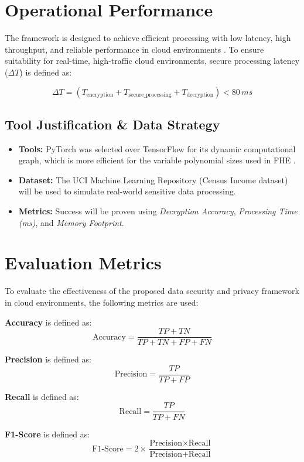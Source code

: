 \documentclass[12pt, a4paper]{article}
\begin{document}
\section{Operational Performance}
The framework is designed to achieve efficient processing with low latency, high throughput, and reliable performance in cloud environments \cite{alam2024fastapi}.
To ensure suitability for real-time, high-traffic cloud environments, secure processing latency ($\Delta T$) is defined as:

\[
\Delta T = (T_{\text{encryption}} + T_{\text{secure\_processing}} + T_{\text{decryption}}) < 80 \, ms
\]

\subsection{Tool Justification \& Data Strategy} 
\begin{itemize}
    \item \textbf{Tools:} PyTorch was selected over TensorFlow for its dynamic computational graph, which is more efficient for the variable polynomial sizes used in FHE \cite{li2023aisecurity}. 
    \item \textbf{Dataset:} The UCI Machine Learning Repository (Census Income dataset) will be used to simulate real-world sensitive data processing. 
    \item \textbf{Metrics:} Success will be proven using \textit{Decryption Accuracy}, \textit{Processing Time (ms)}, and \textit{Memory Footprint}. 
\end{itemize}

\section{Evaluation Metrics}

To evaluate the effectiveness of the proposed data security and privacy framework in cloud environments, the following metrics are used:

\textbf{Accuracy} is defined as:
\[
\text{Accuracy} = \frac{TP + TN}{TP + TN + FP + FN}
\]

\textbf{Precision} is defined as:
\[
\text{Precision} = \frac{TP}{TP + FP}
\]

\textbf{Recall} is defined as:
\[
\text{Recall} = \frac{TP}{TP + FN}
\]

\textbf{F1-Score} is defined as:
\[
\text{F1-Score} = 2 \times \frac{\text{Precision} \times \text{Recall}}{\text{Precision} + \text{Recall}}
\]
\end{document}
